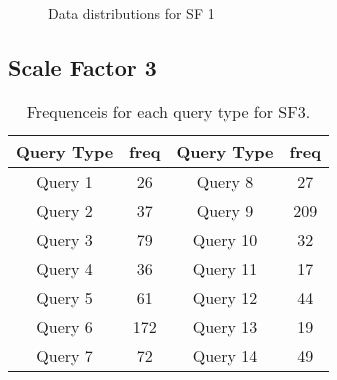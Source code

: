 \begin{figure}[H]
\begin{center}
  \caption{Data distributions for SF 1}
  \label{fig:datadistSF1}
\end{center}
\end{figure}


\subsection{Scale Factor 3}

\begin{table}[H]
\centering
    \begin{tabular}{|c|c|c|c|}
    \hline
    Query Type & freq & Query Type & freq \\ 
    \hline
    \hline
    Query 1 & 26 & Query 8 & 27 \\ 
    \hline       
    Query 2 & 37 & Query 9 & 209 \\  
    \hline        
    Query 3 & 79 & Query 10 & 32 \\ 
    \hline       
    Query 4 & 36 & Query 11 & 17 \\ 
    \hline        
    Query 5 & 61 & Query 12 & 44 \\ 
    \hline        
    Query 6 & 172 & Query 13 & 19 \\  
    \hline        
    Query 7 & 72 & Query 14 & 49 \\ 
    \hline
    \end{tabular}
    \caption{Frequenceis for each query type for SF3.}
    \label{table:freqs_sf3}
\end{table}

